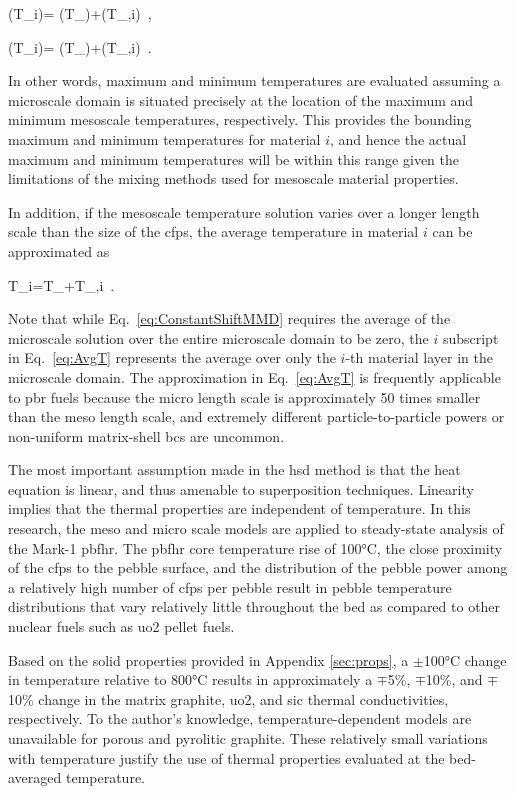 \beq
\label{eq:MaxT}
\left(T_{i}\right)= \left(T_\right)+\left(T_{,i}\right)\ ,
\eeq

\beq
\label{eq:MinT}
\left(T_{i}\right)= \left(T_\right)+\left(T_{,i}\right)\ .
\eeq

\noindent In other words, maximum and minimum temperatures are evaluated assuming a microscale domain is situated precisely at the location of the maximum and minimum mesoscale temperatures, respectively. This provides the bounding maximum and minimum temperatures for material \(i\), and hence the actual maximum and minimum temperatures will be within this range given the limitations of the mixing methods used for mesoscale material properties.

In addition, if the mesoscale temperature solution varies over a longer length scale than the size of the \glspl{cfp}, the average temperature in material \(i\) can be approximated as

\beq
\label{eq:AvgT}
\la T_i\ra=\la T_\ra+\la T_{,i}\ra\ .
\eeq

\noindent Note that while Eq.\ \eqref{eq:ConstantShiftMMD} requires the average of the microscale solution over the entire microscale domain to be zero, the $i$ subscript in Eq.\ \eqref{eq:AvgT} represents the average over only the $i$-th material layer in the microscale domain. The approximation in Eq.\ \eqref{eq:AvgT} is frequently applicable to \gls{pbr} fuels because the micro length scale is approximately 50 times smaller than the meso length scale, and extremely different particle-to-particle powers or non-uniform matrix-shell \glspl{bc} are uncommon.

The most important assumption made in the \gls{hsd} method is that the heat equation is linear, and thus amenable to superposition techniques. Linearity implies that the thermal properties are independent of temperature. In this research, the meso and micro scale models are applied to steady-state analysis of the Mark-1 \gls{pbfhr}. The \gls{pbfhr} core temperature rise of 100\si{\celsius}, the close proximity of the \glspl{cfp} to the pebble surface, and the distribution of the pebble power among a relatively high number of \glspl{cfp} per pebble result in pebble temperature distributions that vary relatively little throughout the bed as compared to other nuclear fuels such as \gls{uo2} pellet fuels. 

Based on the solid properties provided in Appendix \ref{sec:props}, a \(\pm\)100\si{\celsius} change in temperature relative to 800\si{\celsius} results in approximately a \(\mp\)5\%, \(\mp\)10\%, and \(\mp\)10\% change in the matrix graphite, \gls{uo2}, and \gls{sic} thermal conductivities, respectively. To the author's knowledge, temperature-dependent models are unavailable for porous and pyrolitic graphite. These relatively small variations with temperature justify the use of thermal properties evaluated at the bed-averaged temperature.

